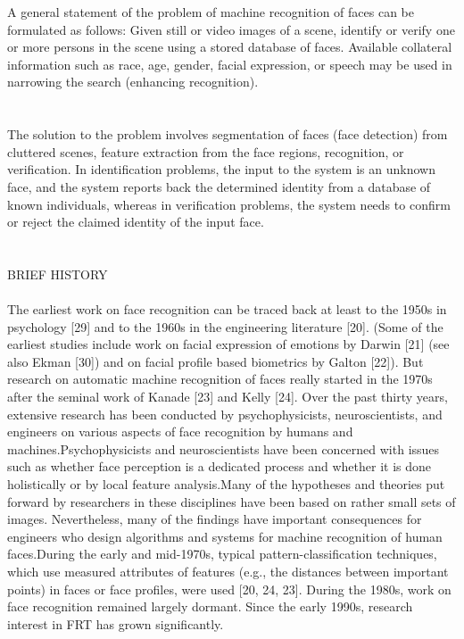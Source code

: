 \documentclass[10pt,a4paper]{article}
\begin{document}
A general statement of the problem of machine recognition of faces can be formulated
as follows: Given still or video images of a scene, identify or verify one
or more persons in the scene using a stored database of faces. Available collateral
information such as race, age, gender, facial expression, or speech may be
used in narrowing the search (enhancing recognition).
\\ \\ \\
The solution to the problem
involves segmentation of faces (face detection) from cluttered scenes, feature
extraction from the face regions, recognition, or verification. In identification problems, the input
to the system is an unknown face, and the system reports back the determined
identity from a database of known individuals, whereas in verification problems,
the system needs to confirm or reject the claimed identity of the input face.
\\ \\ \\
BRIEF HISTORY\\ \\
The earliest work on face recognition can be traced back at least to the 1950s
in psychology [29] and to the 1960s in the engineering literature [20]. (Some of
the earliest studies include work on facial expression of emotions by Darwin [21]
(see also Ekman [30]) and on facial profile based biometrics by Galton [22]). But
research on automatic machine recognition of faces really started in the 1970s
after the seminal work of Kanade [23] and Kelly [24]. Over the past thirty years,
extensive research has been conducted by psychophysicists, neuroscientists, and
engineers on various aspects of face recognition by humans and machines.Psychophysicists and neuroscientists have been concerned with issues such as
whether face perception is a dedicated process and whether it is done holistically or by
local feature analysis.Many of the hypotheses and
theories put forward by researchers in these disciplines have been based on rather
small sets of images. Nevertheless, many of the findings have important consequences
for engineers who design algorithms and systems for machine recognition of human faces.During the early and mid-1970s, typical
pattern-classification techniques, which use measured attributes of features
(e.g., the distances between important points) in faces or face profiles, were
used [20, 24, 23]. During the 1980s, work on face recognition remained largely
dormant. Since the early 1990s, research interest in FRT has grown significantly.
\end{document}
